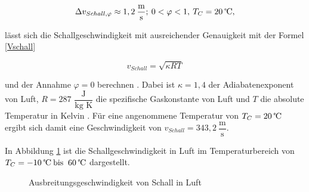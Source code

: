\begin{equation}
    \Delta v_{Schall,\varphi}\approx1,2\:\dfrac{\text{m}}{\text{s}}; \:0<\varphi<1, \:T_{C}=20 \:\text{\textcelsius},
    \label{Vphi}
\end{equation}

\cite{Hering:2023} lässt sich die Schallgeschwindigkeit mit ausreichender Genauigkeit mit der Formel \ref{Vschall}

\begin{equation}
    v_{Schall}=\sqrt{\kappa R T}
    \label{Vschall}
\end{equation} 

und der Annahme $\varphi=0$ berechnen \cite{Tipler:2024}. 
Dabei ist $\kappa = 1{,}4$ der Adiabatenexponent von Luft, $R=287$ \(\dfrac{\text{J}}{\text{kg K}}\) die spezifische Gaskonstante von Luft und $T$ die absolute Temperatur in Kelvin \cite{Tipler:2024,Willems:2022}.
Für eine angenommene Temperatur von $T_{C} = 20\:\text{\textcelsius}$ ergibt sich damit eine Geschwindigkeit von $v_{Schall}=343,2\:\dfrac{\text{m}}{\text{s}}$.


In Abbildung \ref{schallfunktion} ist die Schallgeschwindigkeit in Luft im Temperaturbereich von $T_{C} = -10 \:\text{\textcelsius \:bis } \:60 \:\text{\textcelsius}$ dargestellt.

\begin{figure}[h]
    \begin{center}
        \caption{Ausbreitungsgeschwindigkeit von Schall in Luft}
        \label{schallfunktion}
    \end{center}
\end{figure}

